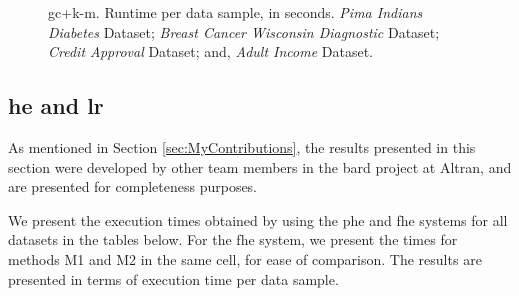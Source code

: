 \begin{figure}[t!]
\caption[\acs{gc}+\acs{k-m}. Runtime per data sample, in seconds. All datasets.]{\acs{gc}+\acs{k-m}. Runtime per data sample, in seconds.
 \emph{Pima Indians Diabetes} Dataset;
 \emph{Breast Cancer Wisconsin Diagnostic} Dataset;
 \emph{Credit Approval} Dataset; and,
 \emph{Adult Income} Dataset.}%
\label{fig:km-gc}%
\end{figure}


\subsection{\acl{he} and \acl{lr}}
\label{ssec:exec_he_lr}

As mentioned in Section \ref{sec:MyContributions}, the results presented in this section were developed by other team members in the \ac{bard} project at Altran, and are presented for completeness purposes.

\vspace*{0.4cm}
We present the execution times obtained by using the \ac{phe} and \ac{fhe} systems for all datasets in the tables below. For the \ac{fhe} system, we present the times for methods M1 and M2 in the same cell, for ease of comparison. The results are presented in terms of execution time per data sample. 

